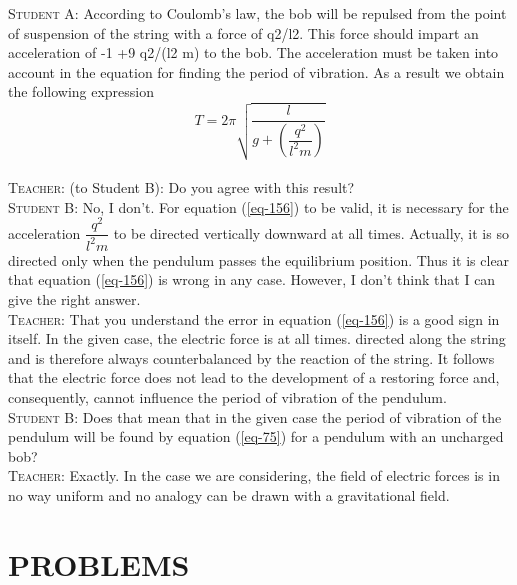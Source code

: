 \documentclass[a4paper,sfsidenotes]{tufte-book}
\begin{document}
\textsc{Student A:} According to Coulomb's law, the bob will be repulsed from the point of suspension of the string with a force of q2/l2. This force should impart an acceleration of -1 +9 q2/(l2 m) to the bob. The acceleration must be taken into account in the equation for finding the period of vibration. As a result we obtain the following expression
\begin{equation}%
T = 2 \pi \sqrt{ \dfrac{l}{g+ \left(\dfrac{q^{2}}{l^{2}m} \right)}}
\label{eq-156}
\end{equation}
\\
\textsc{Teacher:} (to Student B): Do you agree with this result?
\\
\textsc{Student B:} No, I don't. For equation (\ref{eq-156}) to be valid, it is necessary for the acceleration $\dfrac{q^{2}}{l^{2}m} $ to be directed vertically downward at all times. Actually, it is so directed only when the pendulum passes the equilibrium position. Thus it is clear that equation (\ref{eq-156}) is wrong in any case. However, I don't think that I can give the right answer.
\\
\textsc{Teacher:} That you understand the error in equation (\ref{eq-156}) is a good sign in itself. In the given case, the electric force is at all times. directed along the string and is therefore always counterbalanced by the reaction of the string. It follows that the electric force does not lead to the development of a restoring force and, consequently, cannot influence the period of vibration of the pendulum.
\\
\textsc{Student B:} Does that mean that in the given case the period of vibration of the pendulum will be found by equation (\ref{eq-75}) for a pendulum with an uncharged bob?
\\
\textsc{Teacher:} Exactly. In the case we are considering, the field of electric forces is in no way uniform and no analogy can be drawn with a gravitational field.

\section{PROBLEMS}
\label{sec-27-1}
\end{document}
